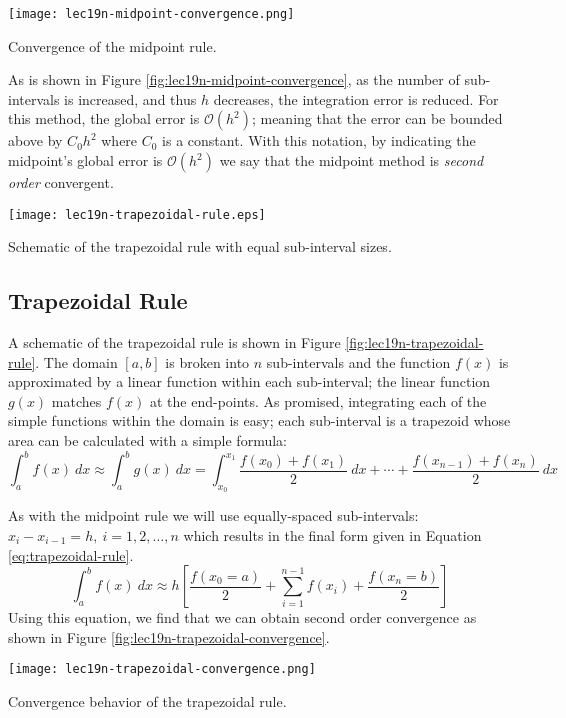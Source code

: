  \begin{marginfigure}
 \texttt{[image: lec19n-midpoint-convergence.png]}
 \caption{Convergence of the midpoint rule.}
 \label{fig:lec19n-midpoint-convergence}
 \end{marginfigure}
 As is shown in Figure \ref{fig:lec19n-midpoint-convergence}, as the number of sub-intervals is increased, and thus $h$ decreases, the integration error is reduced.  For this method, the global error is $\mathcal{O}(h^2)$; meaning that the error can be bounded above by $C_0h^2$ where $C_0$ is a constant.  With this notation, by indicating the midpoint's global error is $\mathcal{O}(h^2)$ we say that the midpoint method is \emph{second order} convergent.
 
 \begin{marginfigure}
 \texttt{[image: lec19n-trapezoidal-rule.eps]}
 \caption{Schematic of the trapezoidal rule with equal sub-interval sizes.}
 \label{fig:lec19n-trapezoidal-rule}
 \end{marginfigure}
 \subsection{Trapezoidal Rule}
 A schematic of the trapezoidal rule is shown in Figure \ref{fig:lec19n-trapezoidal-rule}.  The domain $[a,b]$ is broken into $n$ sub-intervals and the function $f(x)$ is approximated by a linear function within each sub-interval; the linear function $g(x)$ matches $f(x)$ at the end-points. As promised, integrating each of the simple functions within the domain is easy; each sub-interval is a trapezoid whose area can be calculated with a simple formula:
 \begin{equation*}
 \int_{a}^{b} f(x) \ dx \approx \int_{a}^{b} g(x) \ dx = \int_{x_0}^{x_1} \frac{f(x_0)+f(x_1)}{2} \ dx + \cdots + \frac{f(x_{n-1})+ f(x_{n})}{2} \ dx
 \end{equation*} 
 
 As with the midpoint rule we will use equally-spaced sub-intervals: $x_{i}-x_{i-1}=h, \ i=1,2,\dots,n$ which results in the final form given in Equation \ref{eq:trapezoidal-rule}.
 \begin{equation}
 \int_{a}^{b} f(x) \ dx \approx h\left[\frac{f(x_0 = a)}{2} + \sum\limits_{i=1}^{n-1} f(x_i)+\frac{f(x_n = b)}{2} \right]
 \label{eq:trapezoidal-rule}
 \end{equation}
 Using this equation, we find that we can obtain second order convergence as shown in Figure \ref{fig:lec19n-trapezoidal-convergence}.
 \begin{marginfigure}
 \texttt{[image: lec19n-trapezoidal-convergence.png]}
 \caption{Convergence behavior of the trapezoidal rule.}
 \label{fig:lec19n-trapezoidal-convergence}
 \end{marginfigure}


